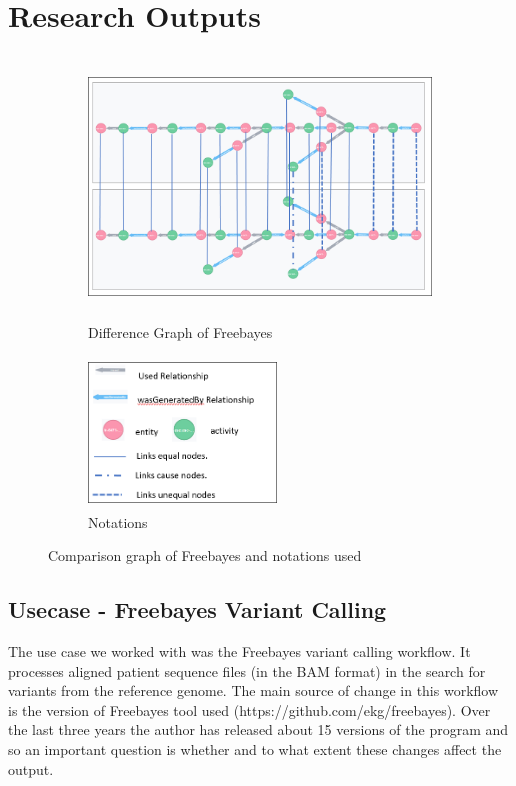 \documentclass[10pt,conference,twocolumn]{IEEEtran}
\begin{document}
\section{Research Outputs}
\begin{figure}
\centering
\begin{subfigure}{.75\textwidth}
  \centering
  \includegraphics[width=13cm,height=7cm]{Difference_Graph.png}
  \caption{Difference Graph of Freebayes}
\label{fig:Difference Graph of Freebayes}
\end{subfigure}%
\begin{subfigure}{.25\textwidth}
   \includegraphics[width=5cm,height=4cm]{Graph_Symbols.png}
  \caption{Notations}
\label{fig:Notations}
\end{subfigure}
\label{fig:test}
\caption{Comparison graph of Freebayes and notations used}
\end{figure}
\subsection{Usecase - Freebayes Variant Calling}
The use case we worked with was the Freebayes variant calling workflow. It processes aligned patient sequence files (in the BAM format) in the search for variants from the reference genome. The main source of change in this workflow is the version of Freebayes tool used (https://github.com/ekg/freebayes). Over the last three years the author has released about 15 versions of the program and so an important question is whether and to what extent these changes affect the output. 
\end{document}
